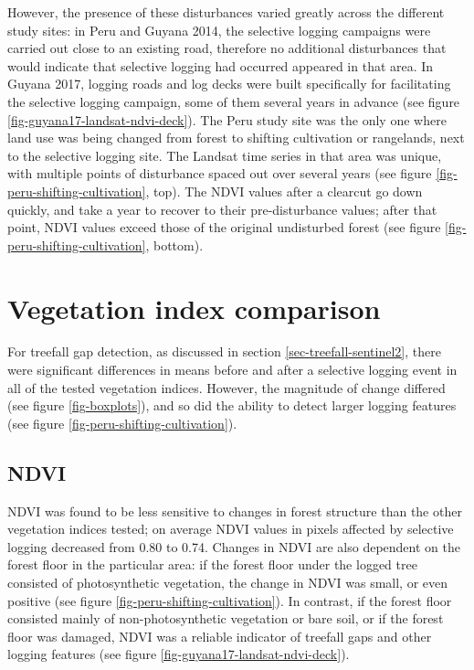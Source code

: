 \documentclass[a4paper,12pt]{scrbook}
\begin{document}
However, the presence of these disturbances varied greatly across the different study sites: in Peru and Guyana 2014, the selective logging campaigns were carried out close to an existing road, therefore no additional disturbances that would indicate that selective logging had occurred appeared in that area. In Guyana 2017, logging roads and log decks were built specifically for facilitating the selective logging campaign, some of them several years in advance (see figure \ref{fig-guyana17-landsat-ndvi-deck}). The Peru study site was the only one where land use was being changed from forest to shifting cultivation or rangelands, next to the selective logging site. The Landsat time series in that area was unique, with multiple points of disturbance spaced out over several years (see figure \ref{fig-peru-shifting-cultivation}, top). The \ac{NDVI} values after a clearcut go down quickly, and take a year to recover to their pre-disturbance values; after that point, \ac{NDVI} values exceed those of the original undisturbed forest (see figure \ref{fig-peru-shifting-cultivation}, bottom).

\section{Vegetation index comparison}

For treefall gap detection, as discussed in section \ref{sec-treefall-sentinel2}, there were significant differences in means before and after a selective logging event in all of the tested vegetation indices. However, the magnitude of change differed (see figure \ref{fig-boxplots}), and so did the ability to detect larger logging features (see figure \ref{fig-peru-shifting-cultivation}).

\subsection{NDVI}

\ac{NDVI} was found to be less sensitive to changes in forest structure than the other vegetation indices tested; on average NDVI values in pixels affected by selective logging decreased from 0.80 to 0.74. Changes in \ac{NDVI} are also dependent on the forest floor in the particular area: if the forest floor under the logged tree consisted of photosynthetic vegetation, the change in NDVI was small, or even positive (see figure \ref{fig-peru-shifting-cultivation}). In contrast, if the forest floor consisted mainly of non-photosynthetic vegetation or bare soil, or if the forest floor was damaged, \ac{NDVI} was a reliable indicator of treefall gaps and other logging features (see figure \ref{fig-guyana17-landsat-ndvi-deck}).
\end{document}
